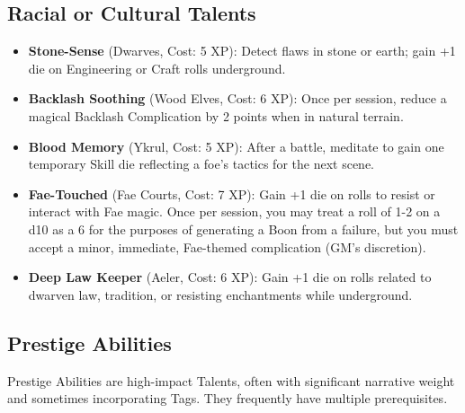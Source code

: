 \subsection*{Racial or Cultural Talents}

\begin{itemize}
    \item \textbf{Stone-Sense} (Dwarves, Cost: 5 XP): Detect flaws in stone or earth; gain +1 die on Engineering or Craft rolls underground.
    \item \textbf{Backlash Soothing} (Wood Elves, Cost: 6 XP): Once per session, reduce a magical Backlash Complication by 2 points when in natural terrain.
    \item \textbf{Blood Memory} (Ykrul, Cost: 5 XP): After a battle, meditate to gain one temporary Skill die reflecting a foe's tactics for the next scene.
    \item \textbf{Fae-Touched} (Fae Courts, Cost: 7 XP): Gain +1 die on rolls to resist or interact with Fae magic. Once per session, you may treat a roll of 1-2 on a d10 as a 6 for the purposes of generating a Boon from a failure, but you must accept a minor, immediate, Fae-themed complication (GM's discretion).
    \item \textbf{Deep Law Keeper} (Aeler, Cost: 6 XP): Gain +1 die on rolls related to dwarven law, tradition, or resisting enchantments while underground.
\end{itemize}

\subsection*{Prestige Abilities}

Prestige Abilities are high-impact Talents, often with significant narrative weight and sometimes incorporating Tags. They frequently have multiple prerequisites.

